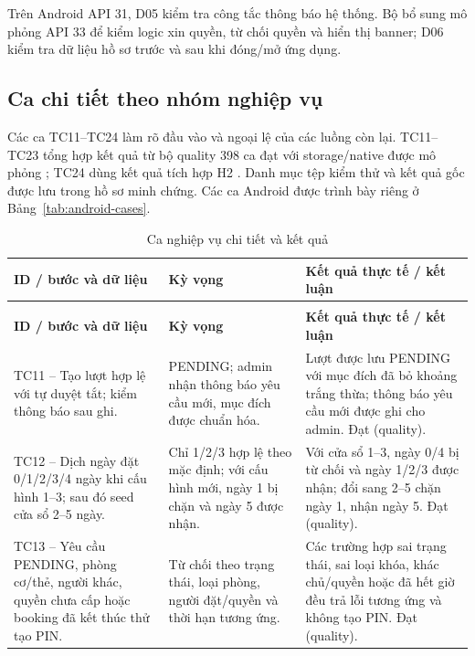Trên Android API 31, D05 kiểm tra công tắc thông báo hệ thống. Bộ bổ sung mô phỏng API 33 để kiểm logic xin quyền, từ chối quyền và hiển thị banner; D06 kiểm tra dữ liệu hồ sơ trước và sau khi đóng/mở ứng dụng.

\subsection{Ca chi tiết theo nhóm nghiệp vụ}
Các ca TC11--TC24 làm rõ đầu vào và ngoại lệ của các luồng còn lại. TC11--TC23 tổng hợp kết quả từ bộ quality 398 ca đạt với storage/native được mô phỏng \cite{currenttests}; TC24 dùng kết quả tích hợp H2 \cite{qualityreport}. Danh mục tệp kiểm thử và kết quả gốc được lưu trong hồ sơ minh chứng. Các ca Android được trình bày riêng ở Bảng~\ref{tab:android-cases}.
{\tabletext\renewcommand{\arraystretch}{1.04}\begin{longtable}{>{\raggedright\arraybackslash}p{}>{\raggedright\arraybackslash}p{}>{\raggedright\arraybackslash}p{}}
\caption{Ca nghiệp vụ chi tiết và kết quả}\label{tab:cases-detail}\\
\toprule \textbf{ID / bước và dữ liệu} & \textbf{Kỳ vọng} & \textbf{Kết quả thực tế / kết luận}\\\midrule
\endfirsthead
\multicolumn{3}{l}{\small Ca nghiệp vụ chi tiết và kết quả (tiếp)}\\
\toprule \textbf{ID / bước và dữ liệu} & \textbf{Kỳ vọng} & \textbf{Kết quả thực tế / kết luận}\\\midrule
\endhead
\bottomrule\endlastfoot
TC11 -- Tạo lượt hợp lệ với tự duyệt tắt; kiểm thông báo sau ghi. & PENDING; admin nhận thông báo yêu cầu mới, mục đích được chuẩn hóa. & Lượt được lưu PENDING với mục đích đã bỏ khoảng trắng thừa; thông báo yêu cầu mới được ghi cho admin. Đạt (quality).\\
TC12 -- Dịch ngày đặt 0/1/2/3/4 ngày khi cấu hình 1--3; sau đó seed cửa sổ 2--5 ngày. & Chỉ 1/2/3 hợp lệ theo mặc định; với cấu hình mới, ngày 1 bị chặn và ngày 5 được nhận. & Với cửa sổ 1--3, ngày 0/4 bị từ chối và ngày 1/2/3 được nhận; đổi sang 2--5 chặn ngày 1, nhận ngày 5. Đạt (quality).\\
TC13 -- Yêu cầu PENDING, phòng cơ/thẻ, người khác, quyền chưa cấp hoặc booking đã kết thúc thử tạo PIN. & Từ chối theo trạng thái, loại phòng, người đặt/quyền và thời hạn tương ứng. & Các trường hợp sai trạng thái, sai loại khóa, khác chủ/quyền hoặc đã hết giờ đều trả lỗi tương ứng và không tạo PIN. Đạt (quality).\\

\end{longtable}}
